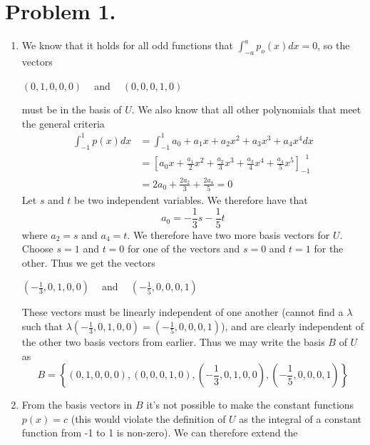 \documentclass[a4paper,11pt,norsk]{article}
\begin{document}


\section*{Problem 1.}
\begin{enumerate}
    \item 
        We know that it holds for all odd functions that $\int_{-a}^{a} p_{o}(x) dx = 0$, so the vectors 
        \begin{center}
            $(0, 1, 0, 0, 0)\:\:\:\:$ and $\:\:\:\:(0, 0, 0, 1, 0)$
        \end{center}
        must be in the basis of $U$. We also know that all other polynomials that meet the general criteria
        \begin{align*}
            \int_{-1}^{1} p(x) dx &= \int_{-1}^{1} a_0 + a_1x + a_2x^2 + a_3x^3 + a_4x^4 dx\\
                                  &= \left[a_0x + \frac{a_1}{2}x^2 + \frac{a_2}{3}x^3 + \frac{a_3}{4}x^4 + \frac{a_4}{5}x^5\right]_{-1}^{\:\:\:1}\\
                                  &= 2a_0 + \frac{2a_2}{3} + \frac{2a_4}{5} = 0
        \end{align*}
        Let $s$ and $t$ be two independent variables. We therefore have that
        \[
            a_0 = -\frac{1}{3}s - \frac{1}{5}t
        \]
        where $a_2 = s$ and $a_4 = t$. We therefore have two more basis vectors for $U$. Choose $s = 1$ and $t = 0$ for one of the vectors
        and $s = 0$ and $t = 1$ for the other. Thus we get the vectors 
        \begin{center}
            $(-\frac{1}{3}, 0, 1, 0, 0)\:\:\:\:$ and $\:\:\:\:(-\frac{1}{5}, 0, 0, 0, 1)$
        \end{center}
        These vectors must be linearly independent of one another (cannot find a $\lambda$ such that $\lambda(-\frac{1}{3}, 0, 1, 0, 0) = (-\frac{1}{5}, 0, 0, 0, 1)$), and 
        are clearly independent of the other two basis vectors from earlier. Thus we may write the basis $B$ of $U$ as
        \[
            B = \left\{(0, 1, 0, 0, 0), (0, 0, 0, 1, 0), \left(-\frac{1}{3}, 0, 1, 0, 0\right), \left(-\frac{1}{5}, 0, 0, 0, 1\right)\right\}
        \]
    \item From the basis vectors in $B$ it's not possible to make the constant functions $p(x) = c$ (this would violate the 
        definition of $U$ as the integral of a constant function from -1 to 1 is non-zero). We can therefore extend the 

\end{enumerate}
\end{document}

